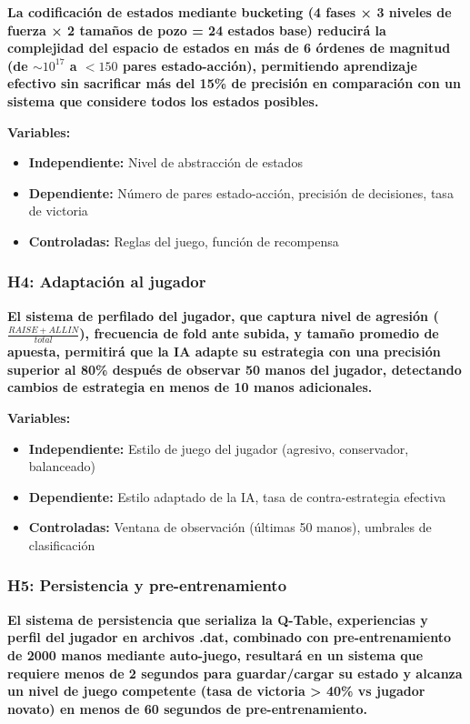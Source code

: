 \documentclass[12pt,a4paper]{article}
\begin{document}
\textbf{La codificación de estados mediante bucketing (4 fases × 3 niveles de fuerza × 2 tamaños de pozo = 24 estados base) reducirá la complejidad del espacio de estados en más de 6 órdenes de magnitud (de $\sim 10^{17}$ a $< 150$ pares estado-acción), permitiendo aprendizaje efectivo sin sacrificar más del 15\% de precisión en comparación con un sistema que considere todos los estados posibles.}

\textbf{Variables:}
\begin{itemize}
    \item \textbf{Independiente:} Nivel de abstracción de estados
    \item \textbf{Dependiente:} Número de pares estado-acción, precisión de decisiones, tasa de victoria
    \item \textbf{Controladas:} Reglas del juego, función de recompensa
\end{itemize}

\subsubsection{H4: Adaptación al jugador}

\textbf{El sistema de perfilado del jugador, que captura nivel de agresión ($\frac{RAISE+ALLIN}{total}$), frecuencia de fold ante subida, y tamaño promedio de apuesta, permitirá que la IA adapte su estrategia con una precisión superior al 80\% después de observar 50 manos del jugador, detectando cambios de estrategia en menos de 10 manos adicionales.}

\textbf{Variables:}
\begin{itemize}
    \item \textbf{Independiente:} Estilo de juego del jugador (agresivo, conservador, balanceado)
    \item \textbf{Dependiente:} Estilo adaptado de la IA, tasa de contra-estrategia efectiva
    \item \textbf{Controladas:} Ventana de observación (últimas 50 manos), umbrales de clasificación
\end{itemize}

\subsubsection{H5: Persistencia y pre-entrenamiento}

\textbf{El sistema de persistencia que serializa la Q-Table, experiencias y perfil del jugador en archivos .dat, combinado con pre-entrenamiento de 2000 manos mediante auto-juego, resultará en un sistema que requiere menos de 2 segundos para guardar/cargar su estado y alcanza un nivel de juego competente (tasa de victoria > 40\% vs jugador novato) en menos de 60 segundos de pre-entrenamiento.}
\end{document}
